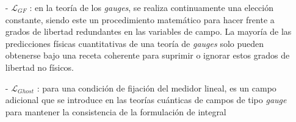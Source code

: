 \begin{itemize}
\item[-] $\mathcal{L}_{GF}$ : en la teoría de los \textit{gauges}, se realiza continuamente una elección constante, siendo este un procedimiento matemático para hacer frente a grados de libertad redundantes en las variables de campo. La mayoría de las predicciones físicas cuantitativas de una teoría de \textit{gauges} solo pueden obtenerse bajo una receta coherente para suprimir o ignorar estos grados de libertad no físicos. %

\item[-] $\mathcal{L}_{Ghost}$ : %
para una condición de fijación del medidor lineal, es un campo adicional que se introduce en las teorías cuánticas de campos de tipo \textit{gauge} para mantener la consistencia de la formulación de integral%
%
\end{itemize}


